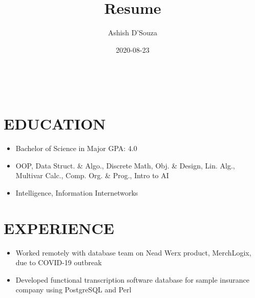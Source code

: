 \documentclass[11pt,letterpaper]{article}
\title{Resume}
\date{2020-08-23}
\author{Ashish D'Souza}
\begin{document}
  \ebgaramond


  \begin{center}
    {\fontsize{24}{24}}
    \\
    {\fontsize{10}{10}}
  \end{center}


  \section*{EDUCATION}
  
  {\fontsize{12}{12}}

  \begin{itemize}
    \item{
      Bachelor of Science in
      {}
      \textemdash{}
      Major GPA: 4.0
    }
    
    \item{
      {}
      \textemdash{}
      OOP, Data Struct. \& Algo., Discrete Math, Obj. \& Design, Lin. Alg., Multivar Calc., Comp. Org. \& Prog., Intro to AI
    }

    \item{
      {}
      \textemdash{}
      Intelligence, Information Internetworks
    }
  \end{itemize}

  \bigskip


  \section*{EXPERIENCE}

  {\fontsize{12}{12}}
  
  \begin{itemize}
    \item{Worked remotely with database team on Nead Werx product, MerchLogix, due to COVID-19 outbreak}
    
    \item{Developed functional transcription software database for sample insurance company using PostgreSQL and Perl}
  \end{itemize}
\end{document}
